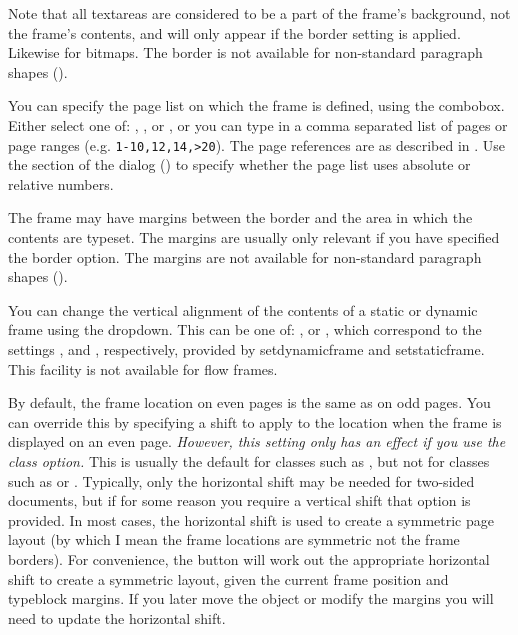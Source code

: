 Note that all \glspl{textarea} are considered to be a part of the
frame's background, not the frame's contents, and will only appear if
the border  setting is
applied. Likewise for \glspl{bitmap}. The border is not available
for non-standard paragraph shapes ().


You can specify the page list on which the frame is defined, using the
 \gls*{combobox}. Either select one of:
,
,
 or
, or you can type in a comma
separated list of pages or page ranges (e.g. \verb|1-10,12,14,>20|).
The page references are as described in
. Use the
 section of the
 dialog () to
specify whether the page list uses absolute or relative numbers.


The frame may have margins between the border and the area in which
the contents are typeset. The margins are usually only relevant
if you have specified the 
border option. The margins are not available for non-standard
paragraph shapes ().


You can change the vertical alignment of the contents of a static or
dynamic frame using the  \gls{dropdown}.
This can be one of: ,
 or ,
which correspond to the settings ,
 and ,
respectively, provided by \gls{setdynamicframe} and
\gls{setstaticframe}. This facility is not available for flow
frames.


By default, the frame location on even pages is the same
 as on odd pages. You can override this by
specifying a shift to apply to the location when the frame is
displayed on an even page. \emph{However, this setting only has an effect
if you use the  class option.} This is usually
the default for classes such as , but not for classes
such as  or . Typically, only the
horizontal shift may be needed for two-sided documents, but if for some
reason you require a vertical shift that option is provided. In most
cases, the horizontal shift is used to create a symmetric page
layout (by which I mean the frame locations are symmetric not the
frame borders). For convenience, the
 button will work out
the appropriate horizontal shift to create a symmetric layout, given
the current frame position and \gls{typeblock} margins. If you later move
the \gls{object} or modify the margins you will need to update the
horizontal shift.

